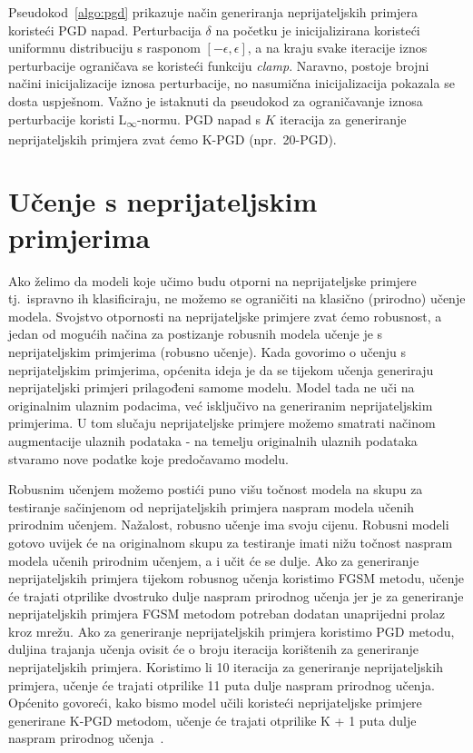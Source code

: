 \documentclass[times, utf8, zavrsni, numeric]{fer}
\begin{document}
\pagebreak

Pseudokod~\ref{algo:pgd} prikazuje način generiranja neprijateljskih primjera koristeći PGD napad. 
Perturbacija $\delta$ na početku je inicijalizirana koristeći uniformnu distribuciju s rasponom $[-\epsilon, \epsilon]$, 
a na kraju svake iteracije iznos perturbacije ograničava se koristeći funkciju \textit{clamp}. 
Naravno, postoje brojni načini inicijalizacije iznosa perturbacije, no nasumična inicijalizacija pokazala se dosta uspješnom.
Važno je istaknuti da pseudokod za ograničavanje iznosa perturbacije koristi L\textsubscript{$\infty$}-normu. 
PGD napad s $K$ iteracija za generiranje neprijateljskih primjera zvat ćemo K-PGD (npr.\ 20-PGD).

\section{Učenje s neprijateljskim primjerima}

Ako želimo da modeli koje učimo budu otporni na neprijateljske primjere tj.\ ispravno ih klasificiraju, ne možemo se ograničiti na klasično (prirodno) učenje modela.
Svojstvo otpornosti na neprijateljske primjere zvat ćemo robusnost, a jedan od mogućih načina za postizanje robusnih modela učenje je s neprijateljskim primjerima (robusno učenje).
Kada govorimo o učenju s neprijateljskim primjerima, općenita ideja je da se tijekom učenja generiraju neprijateljski primjeri prilagođeni samome modelu.
Model tada ne uči na originalnim ulaznim podacima, već isključivo na generiranim neprijateljskim primjerima.
U tom slučaju neprijateljske primjere možemo smatrati načinom augmentacije ulaznih podataka - na temelju originalnih ulaznih podataka stvaramo nove podatke koje predočavamo modelu.

Robusnim učenjem možemo postići puno višu točnost modela na skupu za testiranje sačinjenom od neprijateljskih primjera naspram modela učenih prirodnim učenjem.
Nažalost, robusno učenje ima svoju cijenu. Robusni modeli gotovo uvijek će na originalnom skupu za testiranje imati nižu točnost naspram modela učenih prirodnim učenjem,
a i učit će se dulje. Ako za generiranje neprijateljskih primjera tijekom robusnog učenja koristimo FGSM metodu, učenje će trajati otprilike dvostruko dulje naspram prirodnog učenja
jer je za generiranje neprijateljskih primjera FGSM metodom potreban dodatan unaprijedni prolaz kroz mrežu. 
Ako za generiranje neprijateljskih primjera koristimo PGD metodu, duljina trajanja učenja ovisit će o broju iteracija korištenih za generiranje neprijateljskih primjera.
Koristimo li 10 iteracija za generiranje neprijateljskih primjera, učenje će trajati otprilike 11 puta dulje naspram prirodnog učenja. 
Općenito govoreći, kako bismo model učili koristeći neprijateljske primjere generirane K-PGD metodom, učenje će trajati otprilike K + 1 puta dulje naspram prirodnog učenja~\cite{shafahi2019adversarial}.
\end{document}
